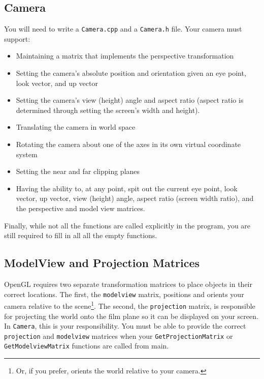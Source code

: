 \documentclass[10pt,twocolumn]{article}
\begin{document}

\subsection{Camera}
You will need to write a {\tt Camera.cpp} and a {\tt Camera.h} file. Your camera must support:
\begin{itemize}
\item Maintaining a matrix that implements the perspective transformation
\item Setting the camera's absolute position and orientation given an eye point, look vector, and up vector
\item Setting the camera's view (height) angle and aspect ratio (aspect ratio is determined through setting the screen's width and height).
\item Translating the camera in world space
\item Rotating the camera about one of the axes in its own virtual coordinate system
\item Setting the near and far clipping planes
\item Having the ability to, at any point, spit out the current eye point, look vector, up vector, view (height) angle, aspect ratio (screen width ratio), and the perspective and model view matrices.
\end{itemize}

Finally, while not all the functions are called explicitly in the program, you are still required to fill in all all the empty functions.

\subsection{ModelView and Projection Matrices}
OpenGL requires two separate transformation matrices to place objects in their correct locations. The first, the {\tt modelview} matrix, positions and orients your camera relative to the scene\footnote{Or, if you prefer, orients the world relative to your camera.}. The second, the {\tt projection} matrix, is responsible for projecting the world onto the film plane so it can be displayed on your screen. In {\tt Camera}, this is your responsibility. You must be able to provide the correct {\tt projection} and {\tt modelview} matrices when your {\tt GetProjectionMatrix} or {\tt GetModelviewMatrix} functions are called from main.
\end{document}
